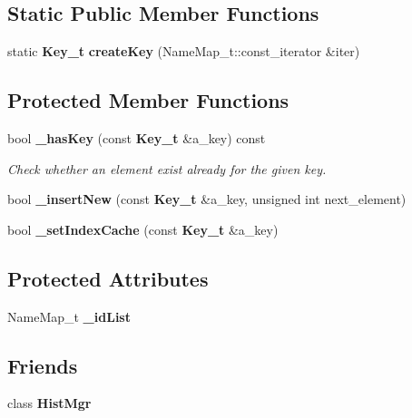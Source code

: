 \subsection*{Static Public Member Functions}
\begin{DoxyCompactItemize}
\item 
static {\bf Key\-\_\-t} {\bfseries create\-Key} (Name\-Map\-\_\-t\-::const\-\_\-iterator \&iter)\label{classhistmgr_1_1KeyMapBase__t_a0abfc2a6b98414d55e92a0c9c69b4b29}

\end{DoxyCompactItemize}
\subsection*{Protected Member Functions}
\begin{DoxyCompactItemize}
\item 
bool {\bf \-\_\-has\-Key} (const {\bf Key\-\_\-t} \&a\-\_\-key) const \label{classhistmgr_1_1KeyMapBase__t_aed1d4e8444789c2f0089bec2b68a091b}

\begin{DoxyCompactList}\small\item\em Check whether an element exist already for the given key. \end{DoxyCompactList}\item 
bool {\bfseries \-\_\-insert\-New} (const {\bf Key\-\_\-t} \&a\-\_\-key, unsigned int next\-\_\-element)\label{classhistmgr_1_1KeyMapBase__t_a8c886c4d400a0549978b170ddd846d1e}

\item 
bool {\bfseries \-\_\-set\-Index\-Cache} (const {\bf Key\-\_\-t} \&a\-\_\-key)\label{classhistmgr_1_1KeyMapBase__t_a51614c13e31ea6616cefd41580c92288}

\end{DoxyCompactItemize}
\subsection*{Protected Attributes}
\begin{DoxyCompactItemize}
\item 
Name\-Map\-\_\-t {\bfseries \-\_\-id\-List}\label{classhistmgr_1_1KeyMapBase__t_a759b7cd45f2bff8c5c5c83954c3f1295}

\end{DoxyCompactItemize}
\subsection*{Friends}
\begin{DoxyCompactItemize}
\item 
class {\bfseries Hist\-Mgr}\label{classhistmgr_1_1KeyMapBase__t_a3cc85db784d7651390e41024125eb3a0}

\end{DoxyCompactItemize}


